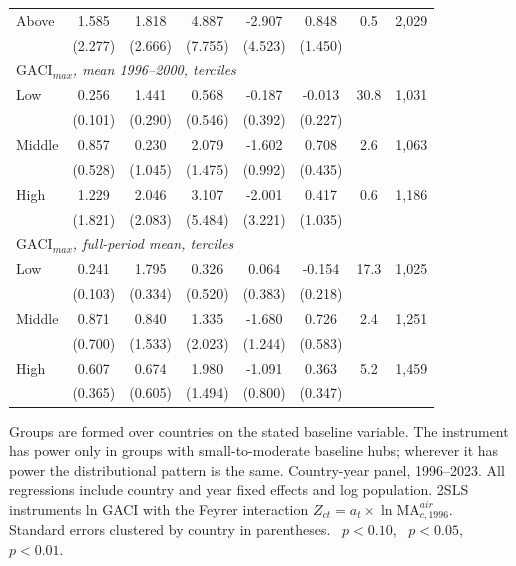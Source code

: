 \begin{table}[p]
\begin{minipage}{\linewidth}
{\begin{tabular}{lccccccc}
\quad Above & 1.585 & 1.818 & 4.887 & -2.907 & 0.848 & 0.5 & 2{,}029 \\
 & (2.277) & (2.666) & (7.755) & (4.523) & (1.450) \\
\multicolumn{8}{l}{\emph{$\mathrm{GACI}_{max}$, mean 1996--2000, terciles}}\\
\quad Low & 0.256\sym{**} & 1.441\sym{***} & 0.568 & -0.187 & -0.013 & 30.8 & 1{,}031 \\
 & (0.101) & (0.290) & (0.546) & (0.392) & (0.227) \\
\quad Middle & 0.857 & 0.230 & 2.079 & -1.602 & 0.708 & 2.6 & 1{,}063 \\
 & (0.528) & (1.045) & (1.475) & (0.992) & (0.435) \\
\quad High & 1.229 & 2.046 & 3.107 & -2.001 & 0.417 & 0.6 & 1{,}186 \\
 & (1.821) & (2.083) & (5.484) & (3.221) & (1.035) \\
\multicolumn{8}{l}{\emph{$\mathrm{GACI}_{max}$, full-period mean, terciles}}\\
\quad Low & 0.241\sym{**} & 1.795\sym{***} & 0.326 & 0.064 & -0.154 & 17.3 & 1{,}025 \\
 & (0.103) & (0.334) & (0.520) & (0.383) & (0.218) \\
\quad Middle & 0.871 & 0.840 & 1.335 & -1.680 & 0.726 & 2.4 & 1{,}251 \\
 & (0.700) & (1.533) & (2.023) & (1.244) & (0.583) \\
\quad High & 0.607\sym{*} & 0.674 & 1.980 & -1.091 & 0.363 & 5.2 & 1{,}459 \\
 & (0.365) & (0.605) & (1.494) & (0.800) & (0.347) \\
\bottomrule
\end{tabular}}
\par\vspace{3pt}\begin{flushleft}\footnotesize Groups are formed over countries on the stated baseline variable. The instrument has power only in groups with small-to-moderate baseline hubs; wherever it has power the distributional pattern is the same. Country-year panel, 1996--2023. All regressions include country and year fixed effects and log population. 2SLS instruments ln GACI with the Feyrer interaction $Z_{ct}=a_t\times\ln \mathrm{MA}^{air}_{c,1996}$. Standard errors clustered by country in parentheses. \sym{*}~$p<0.10$, \sym{**}~$p<0.05$, \sym{***}~$p<0.01$.\end{flushleft}
\end{minipage}
\end{table}

